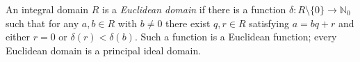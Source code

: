 
An integral domain $R$ is a \emph{Euclidean domain} if there is a function $\delta:R\setminus\{0\}\to\mathbb N_0$ such that for any $a,b\in R$ with $b\ne0$ there exist $q,r\in R$ satisfying $a=bq+r$ and either $r=0$ or $\delta(r)<\delta(b)$. Such a function is a Euclidean function; every Euclidean domain is a principal ideal domain.
